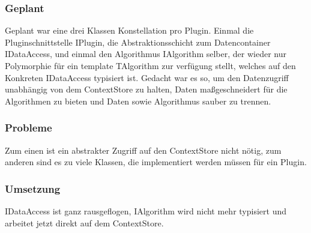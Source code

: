 \subsubsection{Geplant}
Geplant war eine drei Klassen Konstellation pro Plugin. Einmal die Pluginschnittstelle IPlugin, die Abstraktionsschicht zum Datencontainer IDataAccess, und einmal den Algorithmus IAlgorithm selber, der wieder nur Polymorphie für ein template TAlgorithm zur verfügung stellt, welches auf den Konkreten IDataAccess typisiert ist. Gedacht war es so, um den Datenzugriff unabhängig von dem ContextStore zu halten, Daten maßgeschneidert für die Algorithmen zu bieten und Daten sowie Algorithmus sauber zu trennen.
\subsubsection{Probleme}
Zum einen ist ein abstrakter Zugriff auf den ContextStore nicht nötig, zum anderen sind es zu viele Klassen, die implementiert werden müssen für ein Plugin.
\subsubsection{Umsetzung}
IDataAccess ist ganz rausgeflogen, IAlgorithm wird nicht mehr typisiert und arbeitet jetzt direkt auf dem ContextStore.
